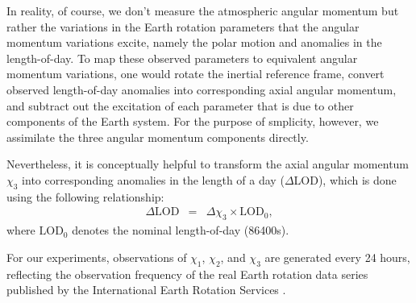 In reality, of course, we don't measure the atmospheric angular momentum but rather the variations in the Earth rotation parameters that the angular momentum variations excite, namely the polar motion and anomalies in the length-of-day. 
To map these observed parameters to equivalent angular momentum variations, one would rotate the inertial reference frame, convert observed length-of-day anomalies into corresponding axial angular momentum, and subtract out the excitation of each parameter that is due to other components of the Earth system.
For the purpose of smplicity, however, we assimilate the three angular momentum components directly.

Nevertheless, it is conceptually helpful to transform the axial angular momentum $\chi_3$ into corresponding anomalies in the length of a day ($\Delta$LOD), which is done using the following relationship:
\begin{eqnarray}
\Delta \text{LOD} &=& \Delta \chi_3 \times \text{LOD}_0 ,
\label{eq:X3_to_LOD}
\end{eqnarray}
where $\text{LOD}_0$ denotes the nominal length-of-day (86400s).  

For our experiments, observations of $\chi_1$, $\chi_2$, and $\chi_3$ are generated every 24 hours, reflecting the observation frequency of the real Earth rotation data series published by the International Earth Rotation Services \citep{iers}.  



